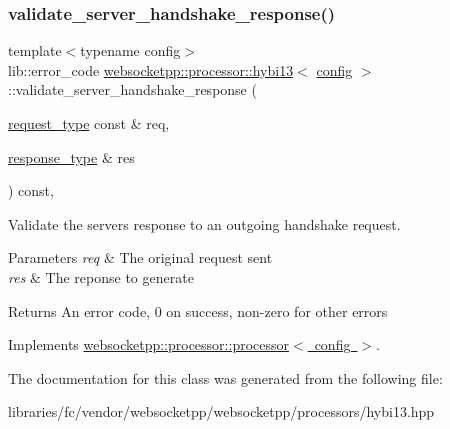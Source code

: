 \subsubsection{\texorpdfstring{validate\+\_\+server\+\_\+handshake\+\_\+response()}{validate\_server\_handshake\_response()}}
{\footnotesize\ttfamily template$<$typename config$>$ \\
lib\+::error\+\_\+code \mbox{\hyperlink{classwebsocketpp_1_1processor_1_1hybi13}{websocketpp\+::processor\+::hybi13}}$<$ \mbox{\hyperlink{classconfig}{config}} $>$\+::validate\+\_\+server\+\_\+handshake\+\_\+response (\begin{DoxyParamCaption}\item[{\mbox{\hyperlink{classwebsocketpp_1_1http_1_1parser_1_1request}{request\+\_\+type}} const \&}]{req,  }\item[{\mbox{\hyperlink{classwebsocketpp_1_1http_1_1parser_1_1response}{response\+\_\+type}} \&}]{res }\end{DoxyParamCaption}) const\hspace{0.3cm}{\ttfamily [inline]}, {\ttfamily [virtual]}}



Validate the server\textquotesingle{}s response to an outgoing handshake request. 


\begin{DoxyParams}{Parameters}
{\em req} & The original request sent \\
\hline
{\em res} & The reponse to generate \\
\hline
\end{DoxyParams}
\begin{DoxyReturn}{Returns}
An error code, 0 on success, non-\/zero for other errors 
\end{DoxyReturn}


Implements \mbox{\hyperlink{classwebsocketpp_1_1processor_1_1processor_ab1228fa9350d9646379888ad528fd4c4}{websocketpp\+::processor\+::processor$<$ config $>$}}.



The documentation for this class was generated from the following file\+:\begin{DoxyCompactItemize}
\item 
libraries/fc/vendor/websocketpp/websocketpp/processors/hybi13.\+hpp\end{DoxyCompactItemize}
